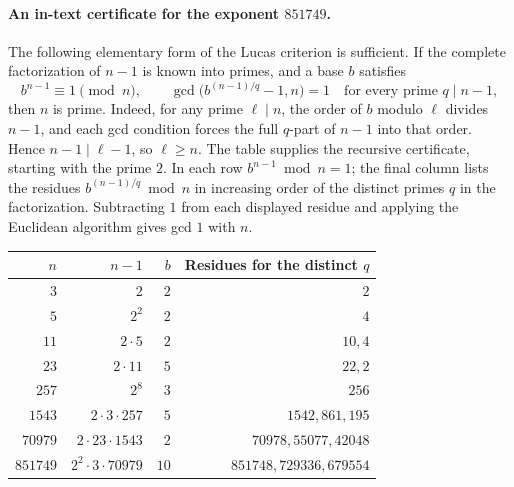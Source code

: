 \documentclass[11pt,a4paper]{article}
\theoremstyle{definition}
\theoremstyle{remark}
\numberwithin{equation}{section}
\begin{document}
\paragraph{An in-text certificate for the exponent $851749$.}
The following elementary form of the Lucas criterion is sufficient.
If the complete factorization of $n-1$ is known into primes, and a base
$b$ satisfies
\[
 b^{n-1}\equiv1\pmod n,\qquad
 \gcd\bigl(b^{(n-1)/q}-1,n\bigr)=1
       \quad\text{for every prime }q\mid n-1,
\]
then $n$ is prime. Indeed, for any prime $\ell\mid n$, the order of $b$
modulo $\ell$ divides $n-1$, and each gcd condition forces the full
$q$-part of $n-1$ into that order. Hence $n-1\mid\ell-1$, so $\ell\ge n$.
The table supplies the recursive certificate, starting with the prime
$2$. In each row $b^{n-1}\bmod n=1$; the final column lists the residues
$b^{(n-1)/q}\bmod n$ in increasing order of the distinct primes $q$ in
the factorization. Subtracting $1$ from each displayed residue and
applying the Euclidean algorithm gives gcd $1$ with $n$.
\begin{center}\small
\begin{tabular}{rrrr}
\toprule
$n$ & $n-1$ & $b$ & Residues for the distinct $q$\\\midrule
$3$ & $2$ & $2$ & $2$\\
$5$ & $2^2$ & $2$ & $4$\\
$11$ & $2\cdot5$ & $2$ & $10,4$\\
$23$ & $2\cdot11$ & $5$ & $22,2$\\
$257$ & $2^8$ & $3$ & $256$\\
$1543$ & $2\cdot3\cdot257$ & $5$ & $1542,861,195$\\
$70979$ & $2\cdot23\cdot1543$ & $2$ & $70978,55077,42048$\\
$851749$ & $2^2\cdot3\cdot70979$ & $10$ & $851748,729336,679554$\\
\bottomrule
\end{tabular}
\end{center}
\end{document}
